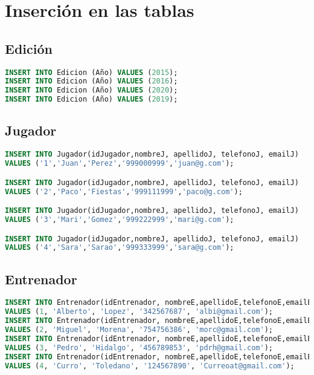 \section{Inserción en las tablas}
\subsection{Edición}
\begin{lstlisting}[language=sql]
INSERT INTO Edicion (Año) VALUES (2015);
INSERT INTO Edicion (Año) VALUES (2016);
INSERT INTO Edicion (Año) VALUES (2020);
INSERT INTO Edicion (Año) VALUES (2019);
\end{lstlisting}

\subsection{Jugador}
\begin{lstlisting}[language=sql]
INSERT INTO Jugador(idJugador,nombreJ, apellidoJ, telefonoJ, emailJ)
VALUES ('1','Juan','Perez','999000999','juan@g.com');

INSERT INTO Jugador(idJugador,nombreJ, apellidoJ, telefonoJ, emailJ)
VALUES ('2','Paco','Fiestas','999111999','paco@g.com');

INSERT INTO Jugador(idJugador,nombreJ, apellidoJ, telefonoJ, emailJ)
VALUES ('3','Mari','Gomez','999222999','mari@g.com');

INSERT INTO Jugador(idJugador,nombreJ, apellidoJ, telefonoJ, emailJ)
VALUES ('4','Sara','Sarao','999333999','sara@g.com');
\end{lstlisting}

\subsection{Entrenador}
\begin{lstlisting}[language=sql]
INSERT INTO Entrenador(idEntrenador, nombreE,apellidoE,telefonoE,emailE)
VALUES (1, 'Alberto', 'Lopez', '342567687', 'albi@gmail.com');
INSERT INTO Entrenador(idEntrenador, nombreE,apellidoE,telefonoE,emailE)
VALUES (2, 'Miguel', 'Morena', '754756386', 'morc@gmail.com');
INSERT INTO Entrenador(idEntrenador, nombreE,apellidoE,telefonoE,emailE)
VALUES (3, 'Pedro', 'Hidalgo', '456789853', 'pdrh@gmail.com');
INSERT INTO Entrenador(idEntrenador, nombreE,apellidoE,telefonoE,emailE)
VALUES (4, 'Curro', 'Toledano', '124567890', 'Curreoat@gmail.com');
\end{lstlisting}

